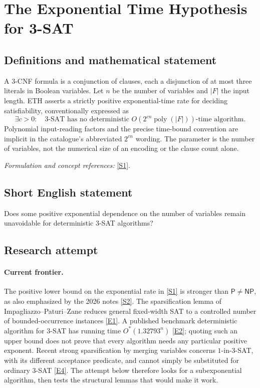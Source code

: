 \documentclass[11pt,a4paper]{article}
\newcommand{\sref}[2]{\hyperlink{source:#1:#2}{[S#2]}}
\newcommand{\eref}[2]{\hyperlink{extra:#1:#2}{[E#2]}}
\newif\ifshowcatalogue
\newcommand{\cataloguescope}[1]{\ifshowcatalogue
 \paragraph{Exact scope in the supplied catalogue.}
 \begin{quote}\small #1\end{quote}\fi}
\numberwithin{equation}{section}
\begin{document}
\setcounter{section}{0}
\clearpage
\section*{\texorpdfstring{The Exponential Time Hypothesis for 3-SAT}{The Exponential Time Hypothesis for 3-SAT}}\label{statement}
\subsection{Definitions and mathematical statement}
A $3$-CNF formula is a conjunction of clauses, each a disjunction of at most three literals in Boolean variables. Let $n$ be the number of variables and $|F|$ the input length. ETH asserts a strictly positive exponential-time rate for deciding satisfiability, conventionally expressed as
\[
 \exists c>0:\quad 3\text{-SAT has no deterministic }O(2^{cn}\operatorname{poly}(|F|))\text{-time algorithm}.
\]
Polynomial input-reading factors and the precise time-bound convention are implicit in the catalogue's abbreviated $2^{cn}$ wording. The parameter is the number of variables, not the numerical size of an encoding or the clause count alone.
\par\smallskip\textit{Formulation and concept references:} \sref{statement}{1}.
\cataloguescope{Prove or disprove the Exponential Time Hypothesis: there exists a constant c > 0 such that 3-SAT cannot be solved in deterministic time 2\textasciicircum{}\{c n\}.}
\subsection{Short English statement}
Does some positive exponential dependence on the number of variables remain unavoidable for deterministic $3$-SAT algorithms?
\subsection{Research attempt}
\paragraph{Current frontier.}
The positive lower bound on the exponential rate in \sref{statement}{1} is
stronger than $\mathsf P\ne\mathsf{NP}$, as also emphasized by the
2026 notes \sref{statement}{2}. The sparsification lemma of
Impagliazzo--Paturi--Zane reduces general fixed-width SAT to a controlled
number of bounded-occurrence instances \eref{statement}{1}. A published
benchmark deterministic algorithm for $3$-SAT has running time
$O^*(1.32793^n)$ \eref{statement}{2}; quoting such an upper bound does not prove
that every algorithm needs any particular positive exponent. Recent
strong sparsification by merging variables concerns $1$-in-$3$-SAT,
with its different acceptance predicate, and cannot simply be substituted
for ordinary $3$-SAT \eref{statement}{4}. The attempt below therefore looks
for a subexponential algorithm, then tests the structural lemmas that
would make it work.
\end{document}
